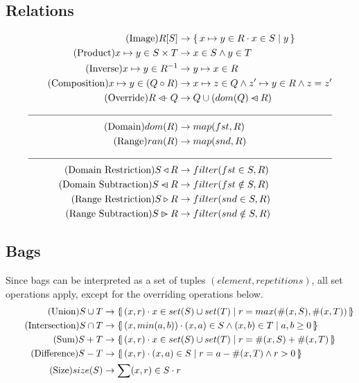 \documentclass{article}
\newcommand{\bSet}[3]{%
  \{\, #1 \cdot #2 \mid #3 \, \}%
}
\newcommand{\lbbar}{\{\kern-0.5ex|}
\newcommand{\rbbar}{|\kern-0.5ex\}}
\newcommand{\bag}[3]{%
  \lbbar \, #1 \cdot #2 \mid #3 \, \rbbar%
}
\begin{document}
\subsection{Relations}
  \begin{align}
  \tag{Image}
  R[S] &\rightarrow \bSet{x \mapsto y \in R}{x \in S}{y}
  \\
  \tag{Product}
  x \mapsto y \in S \times T &\rightarrow x \in S \land y \in T
  \\
  \tag{Inverse}
  x \mapsto y \in R^{-1} &\rightarrow y \mapsto x \in R
  \\
  \tag{Composition}
  x \mapsto y \in (Q \circ R) &\rightarrow x \mapsto z \in Q \land z' \mapsto y \in R \land z=z'
  \\
  \tag{Override}
  R \ovl Q &\rightarrow Q \cup (dom(Q) \domsub R)
  \\
  \cline{1-2}
  \tag{Domain}
  dom(R) &\rightarrow map(fst, R)
  \\
  \tag{Range}
  ran(R) &\rightarrow map(snd, R)
  \\
  \cline{1-2}
  \tag{Domain Restriction}
  S \triangleleft R &\rightarrow filter(fst \in S, R)
  \\
  \tag{Domain Subtraction}
  S \domsub R &\rightarrow filter(fst \notin S, R)
  \\
  \tag{Range Restriction}
  S \triangleright R &\rightarrow filter(snd \in S, R)
  \\
  \tag{Range Subtraction}
  S \ransub R &\rightarrow filter(snd \notin S, R)
\end{align}

\subsection{Bags}
Since bags can be interpreted as a set of tuples $(element, repetitions)$, all set operations apply, except for the overriding operations below.
\begin{align}
  \tag{Union}
  S \cup T &\rightarrow \bag{(x, r)}{x \in set(S) \cup set(T)}{r = max(\#(x,S), \#(x,T))}
  \\
  \tag{Intersection}
  S \cap T &\rightarrow \bag{(x, min(a,b))}{(x,a) \in S \land (x,b) \in T}{a, b \geq 0}
  \\
  \tag{Sum}
  S + T &\rightarrow \bag{(x, r)}{x \in set(S) \cup set(T)}{r = \#(x,S) + \#(x, T)}
  \\
  \tag{Difference}
  S - T &\rightarrow \bag{(x, r)}{(x,a) \in S}{r = a-\#(x, T) \land r > 0}
  \\
  \tag{Size}
  size(S) &\rightarrow \sum (x,r) \in S \cdot r
\end{align}
\end{document}
